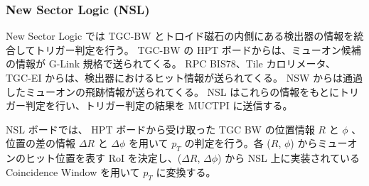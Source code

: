 \subsubsection{New Sector Logic (NSL)}
New Sector Logic では TGC-BW とトロイド磁石の内側にある検出器の情報を統合してトリガー判定を行う。
TGC-BW の HPT ボードからは、ミューオン候補の情報が G-Link 規格で送られてくる。
RPC BIS78、Tile カロリメータ、 TGC-EI からは、検出器におけるヒット情報が送られてくる。
NSW からは通過したミューオンの飛跡情報が送られてくる。
NSL はこれらの情報をもとにトリガー判定を行い、トリガー判定の結果を MUCTPI に送信する。

NSL ボードでは、 HPT ボードから受け取った TGC BW の位置情報 $R$ と $\phi$ 、位置の差の情報 $\Delta R$ と $\Delta \phi$ を用いて $p_T$ の判定を行う。各 ($R$, $\phi$) からミューオンのヒット位置を表す RoI を決定し、($\Delta R$, $\Delta \phi$) から NSL 上に実装されている Coincidence Window を用いて $p_T$ に変換する。










